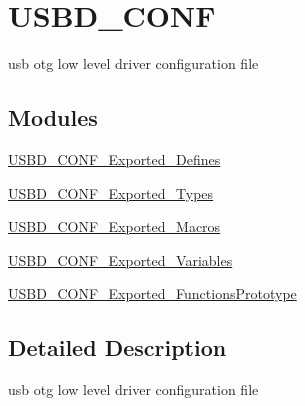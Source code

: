 \hypertarget{group__USBD__CONF}{}\section{U\+S\+B\+D\+\_\+\+C\+O\+NF}
\label{group__USBD__CONF}


usb otg low level driver configuration file  


\subsection*{Modules}
\begin{DoxyCompactItemize}
\item 
\hyperlink{group__USBD__CONF__Exported__Defines}{U\+S\+B\+D\+\_\+\+C\+O\+N\+F\+\_\+\+Exported\+\_\+\+Defines}
\item 
\hyperlink{group__USBD__CONF__Exported__Types}{U\+S\+B\+D\+\_\+\+C\+O\+N\+F\+\_\+\+Exported\+\_\+\+Types}
\item 
\hyperlink{group__USBD__CONF__Exported__Macros}{U\+S\+B\+D\+\_\+\+C\+O\+N\+F\+\_\+\+Exported\+\_\+\+Macros}
\item 
\hyperlink{group__USBD__CONF__Exported__Variables}{U\+S\+B\+D\+\_\+\+C\+O\+N\+F\+\_\+\+Exported\+\_\+\+Variables}
\item 
\hyperlink{group__USBD__CONF__Exported__FunctionsPrototype}{U\+S\+B\+D\+\_\+\+C\+O\+N\+F\+\_\+\+Exported\+\_\+\+Functions\+Prototype}
\end{DoxyCompactItemize}


\subsection{Detailed Description}
usb otg low level driver configuration file 

